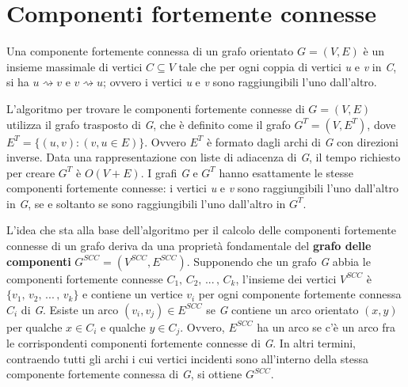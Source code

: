 \documentclass[10pt, a4paper]{report}
\begin{document}
\section{Componenti fortemente connesse}
Una componente fortemente connessa di un grafo orientato $G = (V,E)$ è un insieme massimale di vertici $C \subseteq V$ tale che per ogni coppia di vertici \textit{u} e \textit{v} in \textit{C}, si ha $u \rightsquigarrow v$ e $v \rightsquigarrow u$; ovvero i vertici \textit{u} e \textit{v} sono raggiungibili l'uno dall'altro.

L'algoritmo per trovare le componenti fortemente connesse di $G = (V,E)$ utilizza il grafo trasposto di \textit{G}, che è definito come il grafo $G^T = (V,E^T)$, dove $E^T = \{(u,v) : (v,u \in E)\}$. Ovvero $E^T$ è formato dagli archi di \textit{G} con direzioni inverse. Data una rappresentazione con liste di adiacenza di \textit{G}, il tempo richiesto per creare $G^T$ è $O(V + E)$. I grafi \textit{G} e $G^T$ hanno esattamente le stesse componenti fortemente connesse: i vertici \textit{u} e \textit{v} sono raggiungibili l'uno dall'altro in \textit{G}, se e soltanto se sono raggiungibili l'uno dall'altro in $G^T$.

L'idea che sta alla base dell'algoritmo per il calcolo delle componenti fortemente connesse di un grafo deriva da una proprietà fondamentale del \textbf{grafo delle componenti} $G^{SCC} = (V^{SCC},E^{SCC})$. Supponendo che un grafo \textit{G} abbia le componenti fortemente connesse $C_1,\,C_2,\,...\,,\,C_k$, l'insieme dei vertici $V^{SCC}$ è $\{v_1,\,v_2,\,...\,,\,v_k\}$ e contiene un vertice $v_i$ per ogni componente fortemente connessa $C_i$ di \textit{G}. Esiste un arco $(v_i,v_j) \in E^{SCC}$ se \textit{G} contiene un arco orientato $(x,y)$ per qualche $x \in C_i$ e qualche $y \in C_j$. Ovvero, $E^{SCC}$ ha un arco se c'è un arco fra le corrispondenti componenti fortemente connesse di \textit{G}. In altri termini, contraendo tutti gli archi i cui vertici incidenti sono all'interno della stessa componente fortemente connessa di \textit{G}, si ottiene $G^{SCC}$.
\end{document}

